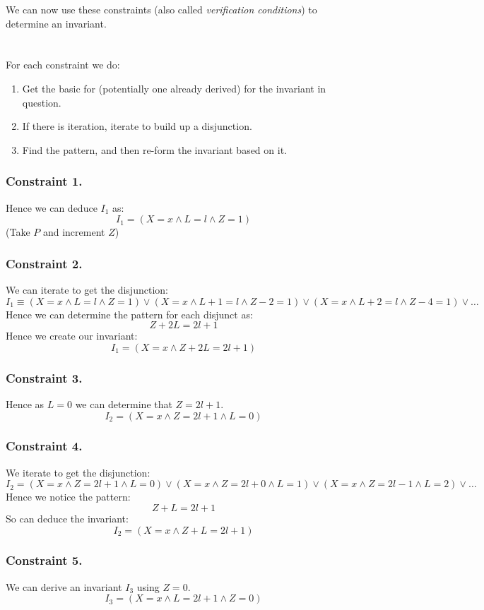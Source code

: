 We can now use these constraints (also called \textit{verification conditions}) to determine an invariant.
\\
\\
\\ For each constraint we do:
\begin{enumerate}
	\item Get the basic for (potentially one already derived) for the invariant in question.
	\item If there is iteration, iterate to build up a disjunction.
	\item Find the pattern, and then re-form the invariant based on it.
\end{enumerate}

\subsubsection*{Constraint 1.}
Hence we can deduce $I_1$ as:
\[I_1 = (X = x \land L = l \land Z = 1)\]
(Take $P$ and increment $Z$)
\subsubsection*{Constraint 2.}
We can iterate to get the disjunction:
\[I_1 \equiv (X=x \land L=l \land Z = 1) \lor (X=x \land L+1 = l \land Z-2 = 1) \lor (X=x \land L+2 = l \land Z - 4 = 1) \lor \dots\]
Hence we can determine the pattern for each disjunct as:
\[Z + 2L = 2l + 1\]
Hence we create our invariant:
\[I_1 = (X = x \land Z + 2L = 2l + 1)\]
\subsubsection*{Constraint 3.}
Hence as $L=0$ we can determine that $Z = 2l + 1$.
\[I_2 = (X=x \land Z = 2l + 1 \land L = 0)\]
\subsubsection*{Constraint 4.}
We iterate to get the disjunction:
\[I_2 = (X = x  \land Z = 2l + 1 \land L = 0) \lor (X = x  \land Z = 2l + 0 \land L = 1) \lor (X = x  \land Z = 2l - 1 \land L = 2) \lor \dots\]
Hence we notice the pattern:
\[Z + L = 2l + 1\]
So can deduce the invariant:
\[I_2 = (X = x \land Z + L = 2l + 1)\]
\subsubsection*{Constraint 5.}
We can derive an invariant $I_3$ using $Z = 0$.
\[I_3 = (X=x \land L = 2l + 1 \land Z = 0)\]
